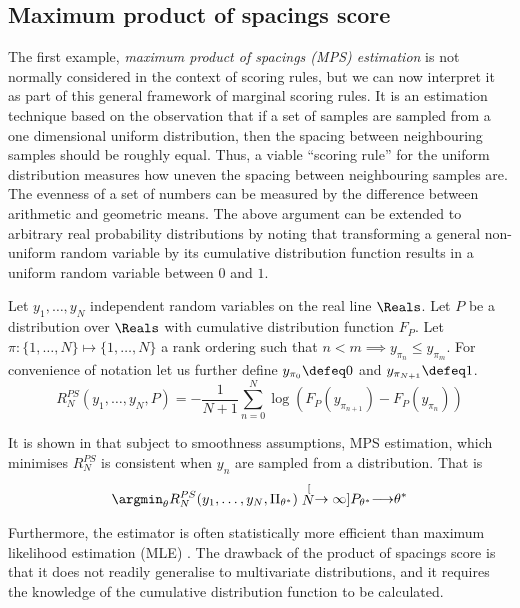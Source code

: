\subsection{Maximum product of spacings score}

The first example, \emph{maximum product of spacings (MPS) estimation} is not normally considered in the context of scoring rules, but we can now interpret it as part of this general framework of marginal scoring rules. It is an estimation technique based on the observation that if a set of samples are sampled from a one dimensional uniform distribution, then the spacing between neighbouring samples should be roughly equal. Thus, a viable ``scoring rule'' for the uniform distribution measures how uneven the spacing between neighbouring samples are. The evenness of a set of numbers can be measured by the difference between arithmetic and geometric means. The above argument can be extended to arbitrary real probability distributions by noting that transforming a general non-uniform random variable by its cumulative distribution function results in a uniform random variable between $0$ and $1$.

\begin{definition}
	Let $y_1,\ldots,y_N$ independent random variables on the real line $\Reals$. Let $P$ be a distribution over $\Reals$ with cumulative distribution function $F_{P}$. Let $\pi:\{1,\ldots,N\}\mapsto\{1,\ldots,N\}$ a rank ordering such that $n<m \implies y_{\pi_{n}}\leq y_{\pi_{m}}$. For convenience of notation let us further define $y_{\pi_0}\defeq 0$ and $y_{\pi_{N+1}}\defeq 1$.
	\begin{equation}
		R^{PS}_N(y_1,\ldots,y_N,P) = - \frac{1}{N+1} \sum_{n=0}^{N} \log \left(F_P\left(y_{\pi_{n+1}}\right) - F_P\left(y_{\pi_{n}}\right) \right)
	\end{equation}
\end{definition}

It is shown in \cite{http://fir.nes.ru/tildegkosenok/MPS.pdf} that subject to smoothness assumptions, MPS estimation, which minimises $R^{PS}_N$ is consistent when $y_n$ are sampled \iid from a distribution. That is
\begin{align}
\argmin_{\theta}R^{PS}_{N}(y_1,\ldots,y_N,\Pi_{\theta^{*}}) \stackrel[N\rightarrow\infty]{P_{\theta^{*}}}{\longrightarrow} \theta^{*}
\end{align}

Furthermore, the estimator is often statistically more efficient than maximum likelihood estimation (MLE) \cite{http://fir.nes.ru/tildegkosenok/MPS.pdf}. The drawback of the product of spacings score is that it does not readily generalise to multivariate distributions, and it requires the knowledge of the cumulative distribution function to be calculated.

